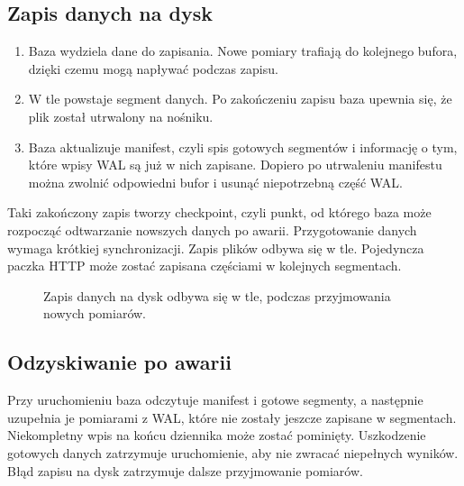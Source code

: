 \documentclass[11pt,a4paper]{article}
\begin{document}
\subsection{Zapis danych na dysk}
\begin{enumerate}
  \item Baza wydziela dane do zapisania. Nowe pomiary trafiają do
        kolejnego bufora, dzięki czemu mogą napływać podczas zapisu.
  \item W tle powstaje segment danych. Po zakończeniu zapisu baza
        upewnia się, że plik został utrwalony na nośniku.
  \item Baza aktualizuje manifest, czyli spis gotowych segmentów
        i informację o tym, które wpisy WAL są już w nich zapisane.
        Dopiero po utrwaleniu manifestu można zwolnić odpowiedni bufor
        i usunąć niepotrzebną część WAL.
\end{enumerate}
Taki zakończony zapis tworzy checkpoint, czyli punkt, od którego
baza może rozpocząć odtwarzanie nowszych danych po awarii.
Przygotowanie danych wymaga krótkiej synchronizacji. Zapis plików
odbywa się w tle. Pojedyncza paczka HTTP może zostać zapisana częściami
w kolejnych segmentach.

\begin{figure}[!htbp]
  \centering
  \caption{Zapis danych na dysk odbywa się w tle, podczas przyjmowania nowych pomiarów.}
  \label{fig:checkpoint}
\end{figure}

\subsection{Odzyskiwanie po awarii}
Przy uruchomieniu baza odczytuje manifest i gotowe segmenty, a następnie
uzupełnia je pomiarami z WAL, które nie zostały jeszcze zapisane w segmentach.
Niekompletny wpis na końcu dziennika może zostać pominięty. Uszkodzenie
gotowych danych zatrzymuje uruchomienie, aby nie zwracać niepełnych wyników.
Błąd zapisu na dysk zatrzymuje dalsze przyjmowanie pomiarów.
\end{document}
